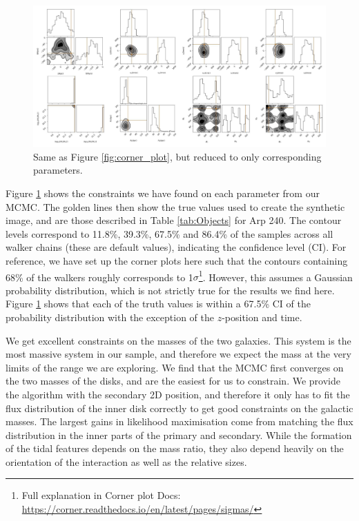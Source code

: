 \begin{figure}
    \centering
    \includegraphics[width=\textwidth]{Chapter1/figures/Arp240-red-corner.pdf}
    \caption[Same as Figure \ref{fig:corner_plot}, but reduced to only corresponding parameters.]{Same as Figure \ref{fig:corner_plot}, but reduced to only corresponding parameters.}
    \label{fig:arp240_corner_plot}
\end{figure}

Figure \ref{fig:arp240_corner_plot} shows the constraints we have found on each parameter from our MCMC. The golden lines then show the true values used to create the synthetic image, and are those described in Table \ref{tab:Objects} for Arp 240. The contour levels correspond to 11.8\%, 39.3\%, 67.5\% and 86.4\% of the samples across all walker chains (these are default values), indicating the confidence level (CI). For reference, we have set up the corner plots here such that the contours containing 68\% of the walkers roughly corresponds to 1$\sigma$\footnote{Full explanation in Corner plot Docs: \url{https://corner.readthedocs.io/en/latest/pages/sigmas/}}. However, this assumes a Gaussian probability distribution, which is not strictly true for the results we find here. Figure \ref{fig:arp240_corner_plot} shows that each of the truth values is within a 67.5\% CI of the probability distribution with the exception of the $z$-position and time.

We get excellent constraints on the masses of the two galaxies. This system is the most massive system in our sample, and therefore we expect the mass at the very limits of the range we are exploring. We find that the MCMC first converges on the two masses of the disks, and are the easiest for us to constrain. We provide the algorithm with the secondary 2D position, and therefore it only has to fit the flux distribution of the inner disk correctly to get good constraints on the galactic masses. The largest gains in likelihood maximisation come from matching the flux distribution in the inner parts of the primary and secondary. While the formation of the tidal features depends on the mass ratio, they also depend heavily on the orientation of the interaction as well as the relative sizes.


